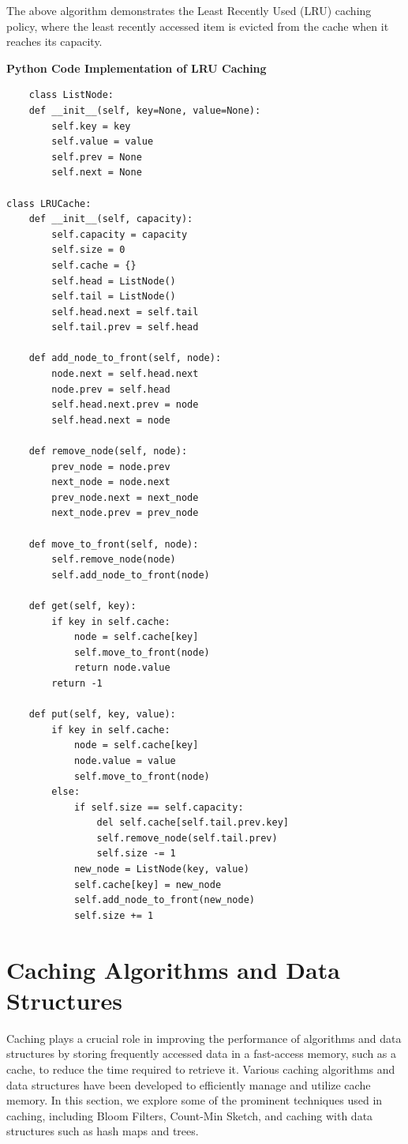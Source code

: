 \documentclass[12pt]{book} %
\begin{document}
The above algorithm demonstrates the Least Recently Used (LRU) caching policy, where the least recently accessed item is evicted from the cache when it reaches its capacity.

\textbf{Python Code Implementation of LRU Caching}
\FloatBarrier
\begin{lstlisting}
    class ListNode:
    def __init__(self, key=None, value=None):
        self.key = key
        self.value = value
        self.prev = None
        self.next = None

class LRUCache:
    def __init__(self, capacity):
        self.capacity = capacity
        self.size = 0
        self.cache = {}
        self.head = ListNode()
        self.tail = ListNode()
        self.head.next = self.tail
        self.tail.prev = self.head

    def add_node_to_front(self, node):
        node.next = self.head.next
        node.prev = self.head
        self.head.next.prev = node
        self.head.next = node

    def remove_node(self, node):
        prev_node = node.prev
        next_node = node.next
        prev_node.next = next_node
        next_node.prev = prev_node

    def move_to_front(self, node):
        self.remove_node(node)
        self.add_node_to_front(node)

    def get(self, key):
        if key in self.cache:
            node = self.cache[key]
            self.move_to_front(node)
            return node.value
        return -1

    def put(self, key, value):
        if key in self.cache:
            node = self.cache[key]
            node.value = value
            self.move_to_front(node)
        else:
            if self.size == self.capacity:
                del self.cache[self.tail.prev.key]
                self.remove_node(self.tail.prev)
                self.size -= 1
            new_node = ListNode(key, value)
            self.cache[key] = new_node
            self.add_node_to_front(new_node)
            self.size += 1
\end{lstlisting}

\section{Caching Algorithms and Data Structures}

Caching plays a crucial role in improving the performance of algorithms and data structures by storing frequently accessed data in a fast-access memory, such as a cache, to reduce the time required to retrieve it. Various caching algorithms and data structures have been developed to efficiently manage and utilize cache memory. In this section, we explore some of the prominent techniques used in caching, including Bloom Filters, Count-Min Sketch, and caching with data structures such as hash maps and trees.
\end{document}
